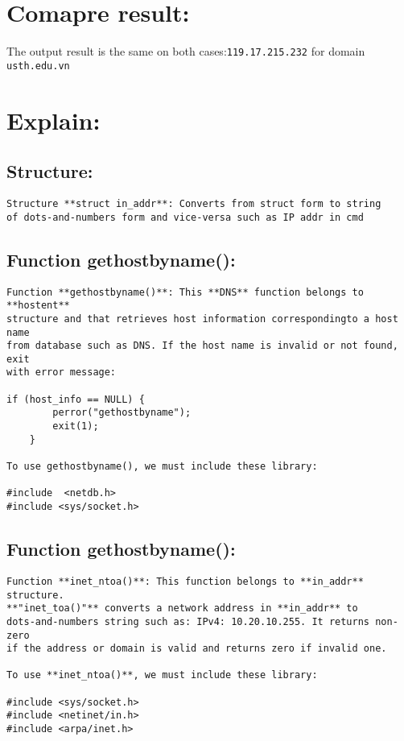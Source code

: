\documentclass[12pt]{article}
\begin{document}
\section{Comapre result:}
The output result is the same on both cases:\Verb"119.17.215.232" for domain \Verb"usth.edu.vn"

\section{Explain:}
\subsection{Structure:}
\begin{verbatim}
Structure **struct in_addr**: Converts from struct form to string 
of dots-and-numbers form and vice-versa such as IP addr in cmd
\end{verbatim}

\subsection{Function gethostbyname():}
\begin{verbatim}
Function **gethostbyname()**: This **DNS** function belongs to **hostent** 
structure and that retrieves host information correspondingto a host name 
from database such as DNS. If the host name is invalid or not found, exit 
with error message:

if (host_info == NULL) {
        perror("gethostbyname");
        exit(1);
    }

To use gethostbyname(), we must include these library:

#include  <netdb.h>
#include <sys/socket.h>
\end{verbatim}

\subsection{Function gethostbyname():}
\begin{verbatim}
Function **inet_ntoa()**: This function belongs to **in_addr** structure.
**"inet_toa()"** converts a network address in **in_addr** to 
dots-and-numbers string such as: IPv4: 10.20.10.255. It returns non-zero 
if the address or domain is valid and returns zero if invalid one.

To use **inet_ntoa()**, we must include these library:

#include <sys/socket.h>
#include <netinet/in.h>
#include <arpa/inet.h>
\end{verbatim}
\end{document}
